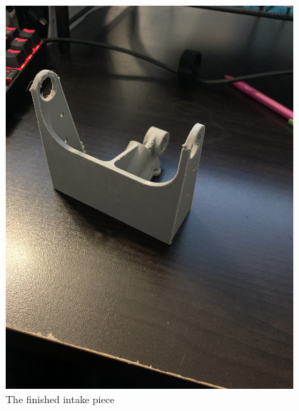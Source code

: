 \begin{figure}[htp]
\centering
\includegraphics[width=0.95\textwidth, angle=0]{Meetings/November/11-23-21/10-23-21_Hardware_Figure3 - Nathan Forrer.JPG}
\caption{The finished intake piece}
\label{fig:112321_3}
\end{figure}




